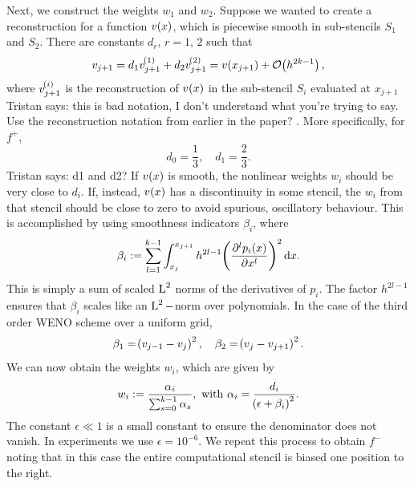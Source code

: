 \documentclass[final]{amsart}
\newcommand{\tristan}[1]{{\color{purple} Tristan says:  #1 }}
\numberwithin{equation}{section}
\begin{document}
Next, we construct the weights $w_1$ and $w_2$.  Suppose
we wanted to create a reconstruction for a function $v\!\left({x}\right)$, which
is piecewise smooth in sub-stencils $S_1$ and $S_2$.  There are
constants $d_r$, $r=1,\,2$ such that
\begin{equation}
v_{j+1}=d_1v_{j+1}^{\!\left({1}\right)} +d_2v_{j+1}^{\!\left({2}\right)}=v\!\left({x_{j+1}}\right)+\mathcal{O}\!\left({h^{2k-1}}\right),
\end{equation} 
where $v^{\!\left({i}\right)}_{j+1}$ is the reconstruction of $v\!\left({x}\right)$ in the
sub-stencil $S_i$ evaluated at $x_{j+1}$ \tristan{this is bad
  notation, I don't understand what you're trying to say. Use the
  reconstruction notation from earlier in the paper?}.  More
specifically, for $f^+$,
\begin{equation}
d_0 = \frac{1}{3},\quad d_1=\frac{2}{3}.
\end{equation}
\tristan{d1 and d2?}  If $v\!\left({x}\right)$ is smooth, the nonlinear weights
$w_i$ should be very close to $d_i$.  If, instead, $v\!\left({x}\right)$ has a
discontinuity in some stencil, the $w_i$ from that stencil should be
close to zero to avoid spurious, oscillatory behaviour.  This is
accomplished by using smoothness indicators $\beta_i$, where
\begin{equation}
\beta_i:=\sum_{l=1}^{k-1}\int^{x_{j+1}}_{x_j}h^{2l-1}\!\left({\frac{\partial^lp_i\!\left({x}\right)}{\partial x^l}}\right)^2\mathrm{d}x.
\end{equation}
This is simply a sum of scaled $\operatorname L^{2}$ norms of the derivatives of $p_i$.  The factor $h^{2l-1}$ ensures that $\beta_i$ scales like an $\operatorname L^{2}-$norm over polynomials. In the case of the third order WENO scheme over a uniform grid, 
\begin{equation}
\beta_1=\!\left({v_{j-1}-v_j}\right)^2,\quad \beta_2=\!\left({v_j-v_{j+1}}\right)^2.
\end{equation}
We can now obtain the weights $w_i$, which are given by
\begin{equation}\label{eq_non_lin_weights}
w_i:=\frac{\alpha_i}{\sum_{s=0}^{k-1}\alpha_s},  \text{ with  }\alpha_i = \frac{d_i}{\!\left({\epsilon +\beta_i}\right)^2}.
\end{equation}
The constant $\epsilon \ll 1$ is a small constant to ensure the
denominator does not vanish.  In experiments we use
$\epsilon=10^{-6}$.  We repeat this process to obtain $f^-$ noting
that in this case the entire computational stencil is biased one
position to the right.
\end{document}
